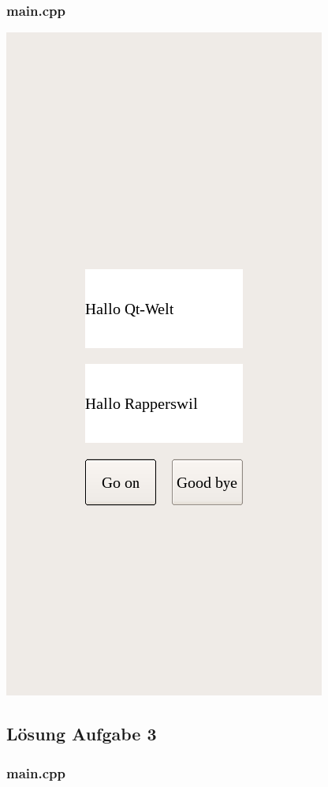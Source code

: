 \subsubsection{main.cpp}

\begin{center}
	\includegraphics[scale=.5]{./images/u11a2.png}
\end{center}
\subsection{Lösung Aufgabe 3}
\subsubsection{main.cpp}



